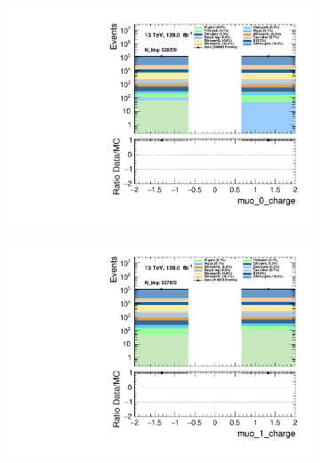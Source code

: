 \begin{figure}
    \centering
    \begin{subfigure}{.49\textwidth}
        \includegraphics[width=\textwidth]{Figures/MC_Data_comp/muo_0_charge.pdf}
        \caption{}
        \label{fig:et}
    \end{subfigure}
    \hfill
    \begin{subfigure}{.49\textwidth}
        \includegraphics[width=\textwidth]{Figures/MC_Data_comp/muo_1_charge.pdf}
        \caption{ }
        \label{fig:flcp}
    \end{subfigure}
    \hfill 
    \begin{subfigure}{.49\textwidth}

\end{subfigure}
\end{figure}
